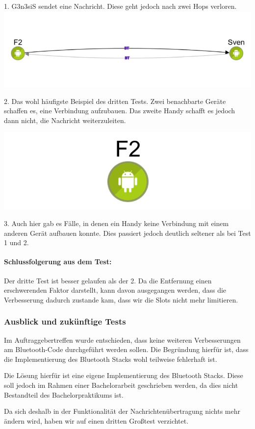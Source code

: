 1. G3n3siS sendet eine Nachricht. Diese geht jedoch nach zwei Hops verloren.\\

\includegraphics[width=1.0\textwidth]{belege/grosstests/Bilder/Grosstest2/Test3Misserfolg2.jpg}

2. Das wohl häufigste Beispiel des dritten Tests. Zwei benachbarte Geräte
schaffen es, eine Verbindung aufzubauen. Das zweite Handy schafft es
jedoch dann nicht, die Nachricht weiterzuleiten.

\includegraphics[width=1.0\textwidth]{belege/grosstests/Bilder/Grosstest2/Test3Misserfolg3.jpg}

3. Auch hier gab es Fälle, in denen ein Handy keine Verbindung mit einem anderen Gerät aufbauen konnte. Dies passiert jedoch deutlich seltener als bei Test 1 und 2.

\paragraph{Schlussfolgerung aus dem Test:}

Der dritte Test ist besser gelaufen als der 2. Da die Entfernung einen
erschwerenden Faktor darstellt, kann davon ausgegangen werden, dass die
Verbesserung dadurch zustande kam, dass wir die Slots nicht mehr
limitieren.

\subsubsection{Ausblick und zukünftige Tests}

Im Auftraggebertreffen wurde entschieden, dass keine weiteren
Verbesserungen am Bluetooth-Code durchgeführt werden sollen. Die Begründung
hierfür ist, dass die Implementierung des Bluetooth Stacks wohl
teilweise fehlerhaft ist.

Die Lösung hierfür ist eine eigene Implementierung des Bluetooth Stacks.
Diese soll jedoch im Rahmen einer Bachelorarbeit geschrieben werden, da
dies nicht Bestandteil des Bachelorpraktikums ist.

Da sich deshalb in der Funktionalität der Nachrichtenübertragung nichts
mehr ändern wird, haben wir auf einen dritten Großtest verzichtet.
